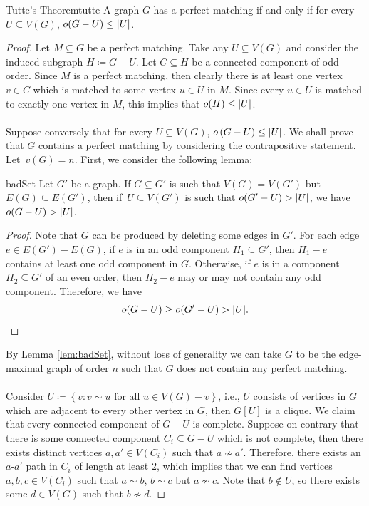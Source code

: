\documentclass[math]{amznotes}
\theoremstyle{remark}
\begin{document}
\begin{thmbox}{Tutte's Theorem}{tutte}
    A graph $G$ has a perfect matching if and only if for every $U \subseteq V(G)$, $o(G - U) \leq {\left\lvert {U} \right\rvert}$.
    \tcblower
    \begin{proof}
        Let $M \subseteq G$ be a perfect matching. Take any $U \subseteq V(G)$ and consider the induced subgraph $H \coloneqq G - U$. Let $C \subseteq H$ be a connected component of odd order. Since $M$ is a perfect matching, then clearly there is at least one vertex $v \in C$ which is matched to some vertex $u \in U$ in $M$. Since every $u \in U$ is matched to exactly one vertex in $M$, this implies that $o(H) \leq {\left\lvert {U} \right\rvert}$.
        \\\\
        Suppose conversely that for every $U \subseteq V(G)$, $o\left(G - U\right) \leq {\left\lvert {U} \right\rvert}$. We shall prove that $G$ contains a perfect matching by considering the contrapositive statement. Let~$v(G) = n$. First, we consider the following lemma:
        \begin{lembox}{}{badSet}
            Let $G'$ be a  graph. If $G \subseteq G'$ is such that $V(G) = V(G')$ but $E(G) \subseteq E(G')$, then if~$U \subseteq V(G')$ is such that $o(G' - U) > {\left\lvert {U} \right\rvert}$, we have $o(G - U) > {\left\lvert {U} \right\rvert}$.
            \tcblower
            \begin{proof}
                Note that $G$ can be produced by deleting some edges in $G'$. For each edge~$e \in E(G') - E(G)$, if $e$ is in an odd component $H_1 \subseteq G'$, then $H_1 - e$ contains at least one odd component in $G$. Otherwise, if $e$ is in a component $H_2 \subseteq G'$ of an even order, then $H_2 - e$ may or may not contain any odd component. Therefore, we have
                \begin{equation*}
                    o(G - U) \geq o(G' - U) > {\left\lvert {U} \right\rvert}.
                \end{equation*}  
            \end{proof}
        \end{lembox}
        By Lemma \ref{lem:badSet}, without loss of generality we can take $G$ to be the edge-maximal graph of order $n$ such that $G$ does not contain any perfect matching. 
        \\\\
        Consider $U \coloneqq \left\{v \colon v \sim u \textrm{ for all } u \in V(G) - v\right\}$, i.e., $U$ consists of vertices in $G$ which are adjacent to every other vertex in $G$, then $G[U]$ is a clique. We claim that every connected component of $G - U$ is complete. Suppose on contrary that there is some connected component $C_i \subseteq G - U$ which is not complete, then there exists distinct vertices $a, a' \in V(C_i)$ such that $a \not\sim a'$. Therefore, there exists an $a$-$a'$ path in $C_i$ of length at least $2$, which implies that we can find vertices $a, b, c \in V(C_i)$ such that $a \sim b$, $b \sim c$ but $a \not\sim c$. Note that $b \notin U$, so there exists some $d \in V(G)$ such that $b \not\sim d$.

\end{proof}
\end{thmbox}
\end{document}
